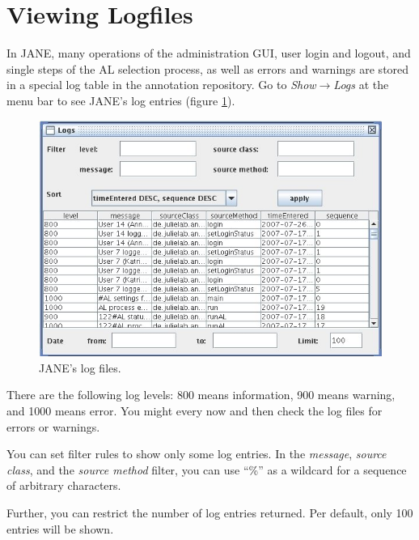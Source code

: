\documentclass[DIV12,english,11pt,halfparskip]{scrartcl}
\begin{document}
\section{Viewing Logfiles}

In JANE, many operations of the administration GUI, user login and
logout, and single steps of the AL selection process, as well as
errors and warnings are stored in a special log table in the
annotation repository. Go to \emph{Show$\rightarrow$Logs} at the menu
bar to see JANE's log entries (figure \ref{fig:showlogs}).


\begin{figure}[h]
  \centering
  \includegraphics[scale=0.5]{figs/ShowLogs.jpg}
  \caption{JANE's log files.}
  \label{fig:showlogs}
\end{figure}

There are the following log levels: 800 means information, 900 means
warning, and 1000 means error. You might every now and then check the
log files for errors or warnings.

You can set filter rules to show only some log entries. In the
\emph{message}, \emph{source class}, and the \emph{source method}
filter, you can use ``\%'' as a wildcard for a sequence of arbitrary
characters.

Further, you can restrict the number of log entries returned. Per
default, only 100 entries will be shown.
\end{document}
